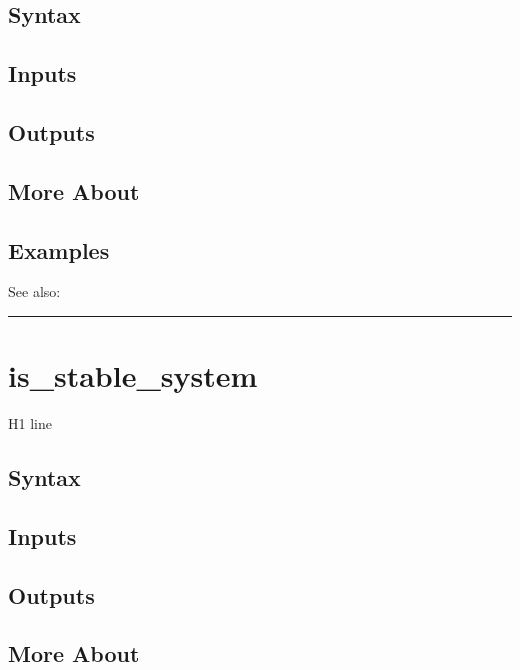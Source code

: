\documentclass[letterpaper,10pt,english]{sphinxmanual}
\begin{document}
\subsection{Syntax}
\label{classes/models/@dsge/dsge:id69}

\subsection{Inputs}
\label{classes/models/@dsge/dsge:id70}

\subsection{Outputs}
\label{classes/models/@dsge/dsge:id71}

\subsection{More About}
\label{classes/models/@dsge/dsge:id72}

\subsection{Examples}
\label{classes/models/@dsge/dsge:id73}
See also:


\bigskip\hrule{}\bigskip



\section{is\_stable\_system}
\label{classes/models/@dsge/dsge:is-stable-system}\label{classes/models/@dsge/dsge:id74}
H1 line


\subsection{Syntax}
\label{classes/models/@dsge/dsge:id75}

\subsection{Inputs}
\label{classes/models/@dsge/dsge:id76}

\subsection{Outputs}
\label{classes/models/@dsge/dsge:id77}

\subsection{More About}
\label{classes/models/@dsge/dsge:id78}
\end{document}
